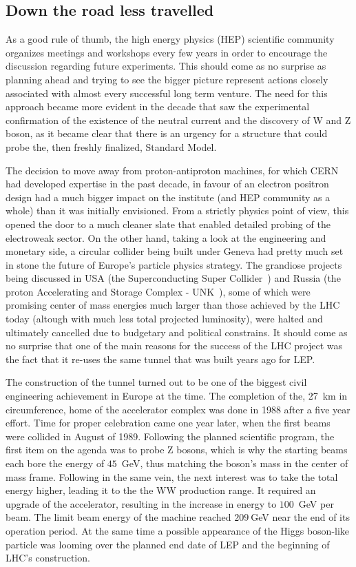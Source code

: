 \subsection{Down the road less travelled}
\hspace{10pt} As a good rule of thumb, the high energy physics (HEP) scientific community organizes meetings and workshops every few years in order to encourage the discussion regarding future experiments. This should come as no surprise as planning ahead and trying to see the bigger picture represent actions closely associated with almost every successful long term venture. The need for this approach became more evident in the decade that saw the experimental confirmation of the existence of the neutral current and the discovery of W and Z boson, as it became clear that there is an urgency for a structure that could probe the, then freshly finalized, Standard Model.

\hspace{10pt} The decision to move away from proton-antiproton machines, for which CERN had developed expertise in the past decade, in favour of an electron positron design had a much bigger impact on the institute (and HEP community as a whole) than it was initially envisioned. From a strictly physics point of view, this opened the door to a much cleaner slate that enabled detailed probing of the electroweak sector. On the other hand, taking a look at the engineering and monetary side, a circular collider being built under Geneva had pretty much set in stone the future of Europe's particle physics strategy. The grandiose projects being discussed in USA (the Superconducting Super Collider~\cite{SSC_proposal}) and Russia (the proton Accelerating and Storage Complex - UNK~\cite{UNK_proposal}), some of which were promising center of mass energies much larger than those achieved by the LHC today (altough with much less total projected luminosity), were halted and ultimately cancelled due to budgetary and political constrains. It should come as no surprise that one of the main reasons for the success of the LHC project was the fact that it re-uses the same tunnel that was built years ago for LEP.

\hspace{10pt} The construction of the tunnel turned out to be one of the biggest civil engineering achievement in Europe at the time. The completion of the, 27~km in circumference, home of the accelerator complex was done in 1988 after a five year effort. Time for proper celebration came one year later, when the first beams were collided in August of 1989. Following the planned scientific program, the first item on the agenda was to probe Z bosons, which is why the starting beams each bore the energy of $45$~GeV, thus matching the boson's mass in the center of mass frame. Following in the same vein, the next interest was to take the total energy higher, leading it to the the WW production range. It required an upgrade of the accelerator, resulting in the increase in energy to $100$~GeV per beam. The limit beam energy of the machine reached $209~$GeV near the end of its operation period. At the same time a possible appearance of the Higgs boson-like particle was looming over the planned end date of LEP and the beginning of LHC's construction.

